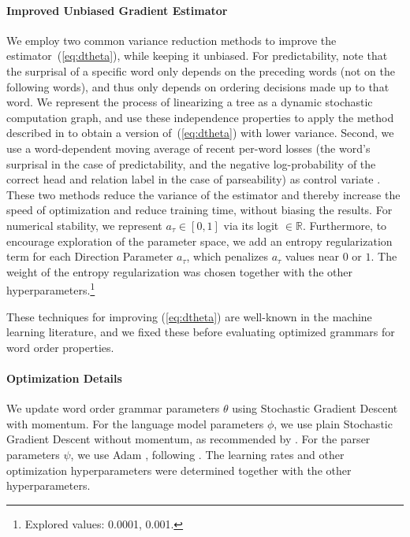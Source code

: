 \documentclass[10pt,twoside,lineno]{article}
\begin{document}
\paragraph{Improved Unbiased Gradient Estimator}
We employ two common variance reduction methods to improve the estimator~(\ref{eq:dtheta}), while keeping it unbiased.
For predictability, note that the surprisal of a specific word only depends on the preceding words (not on the following words), and thus only depends on ordering decisions made up to that word.
We represent the process of linearizing a tree as a dynamic stochastic computation graph, and use these independence properties to apply the method described in \citet{schulman2015gradient} to obtain a version of~(\ref{eq:dtheta}) with lower variance.
Second, we use a word-dependent moving average of recent per-word losses (the word's surprisal in the case of predictability, and the negative log-probability of the correct head and relation label in the case of parseability) as control variate \cite{williams1992simple}.
These two methods reduce the variance of the estimator and thereby increase the speed of optimization and reduce training time, without biasing the results.
For numerical stability, we represent $a_\tau \in [0,1]$ via its logit $\in \mathbb{R}$.
Furthermore, to encourage exploration of the parameter space, we add an entropy regularization term \citep{xu2015show} for each Direction Parameter $a_\tau$, which penalizes $a_\tau$ values near $0$ or $1$. The weight of the entropy regularization was chosen together with the other hyperparameters.\footnote{Explored values: 0.0001, 0.001.}


These techniques for improving (\ref{eq:dtheta}) are well-known in the machine learning literature, and we fixed these before evaluating optimized grammars for word order properties.

\paragraph{Optimization Details}
We update word order grammar parameters $\theta$ using Stochastic Gradient Descent with momentum.
For the language model parameters $\phi$, we use plain Stochastic Gradient Descent without momentum, as recommended by \citet{merity2018regularizing}. 
For the parser parameters $\psi$, we use Adam \citep{kingma2014adam}, following \citet{dozat2017stanford}.
The learning rates and other optimization hyperparameters were determined together with the other hyperparameters.
\end{document}
